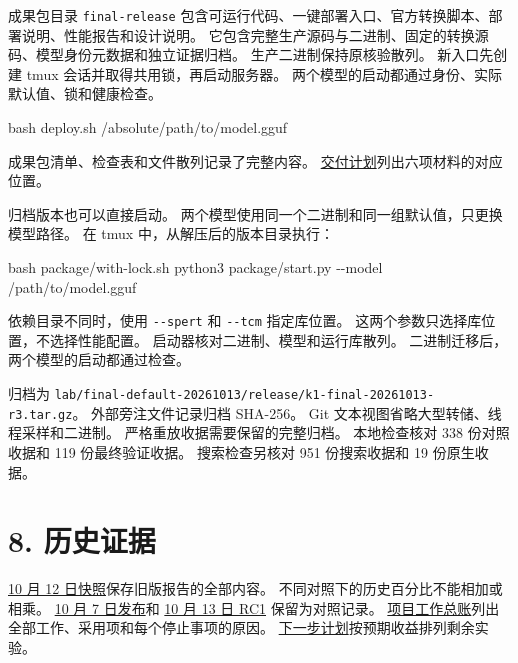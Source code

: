\documentclass[10pt,a4paper,fontset=none]{ctexart}
\newenvironment{Shaded}{}{}
\newcommand{\FunctionTok}[1]{\textcolor[rgb]{0.02,0.16,0.49}{#1}}
\newcommand{\NormalTok}[1]{#1}
\begin{document}
成果包目录 \nolinkurl{final-release}
包含可运行代码、一键部署入口、官方转换脚本、部署说明、性能报告和设计说明。
它包含完整生产源码与二进制、固定的转换源码、模型身份元数据和独立证据归档。
生产二进制保持原核验散列。 新入口先创建 tmux
会话并取得共用锁，再启动服务器。
两个模型的启动都通过身份、实际默认值、锁和健康检查。

\begin{Shaded}
\begin{Highlighting}[]
\FunctionTok{bash}\NormalTok{ deploy.sh /absolute/path/to/model.gguf}
\end{Highlighting}
\end{Shaded}

成果包清单、检查表和文件散列记录了完整内容。
\href{https://github.com/MoyaMryia/riscv-accl/blob/main/spacemit/final-release/SUBMISSION-PLAN.md}{交付计划}列出六项材料的对应位置。

归档版本也可以直接启动。
两个模型使用同一个二进制和同一组默认值，只更换模型路径。 在 tmux
中，从解压后的版本目录执行：

\begin{Shaded}
\begin{Highlighting}[]
\FunctionTok{bash}\NormalTok{ package/with{-}lock.sh python3 package/start.py {-}{-}model /path/to/model.gguf}
\end{Highlighting}
\end{Shaded}

依赖目录不同时，使用 \nolinkurl{--spert} 和 \nolinkurl{--tcm}
指定库位置。 这两个参数只选择库位置，不选择性能配置。
启动器核对二进制、模型和运行库散列。
二进制迁移后，两个模型的启动都通过检查。

归档为
\nolinkurl{lab/final-default-20261013/release/k1-final-20261013-r3.tar.gz}。
外部旁注文件记录归档 SHA-256。 Git
文本视图省略大型转储、线程采样和二进制。
严格重放收据需要保留的完整归档。 本地检查核对 338 份对照收据和 119
份最终验证收据。 搜索检查另核对 951 份搜索收据和 19 份原生收据。

\hypertarget{ux5386ux53f2ux8bc1ux636e}{%
\section{8. 历史证据}\label{ux5386ux53f2ux8bc1ux636e}}

\href{https://github.com/MoyaMryia/riscv-accl/blob/main/spacemit/reports/snapshots/2026-10-12/SUBMISSION-REPORT.pdf}{10
月 12 日快照}保存旧版报告的全部内容。
不同对照下的历史百分比不能相加或相乘。
\href{https://github.com/MoyaMryia/riscv-accl/blob/main/spacemit/reports/2026-10-07-release-verification.md}{10
月 7 日发布}和
\href{https://github.com/MoyaMryia/riscv-accl/blob/main/spacemit/reports/2026-10-13-unified-release-candidate.md}{10
月 13 日 RC1} 保留为对照记录。
\href{https://github.com/MoyaMryia/riscv-accl/blob/main/spacemit/reports/WORK-LEDGER.md}{项目工作总账}列出全部工作、采用项和每个停止事项的原因。
\href{https://github.com/MoyaMryia/riscv-accl/blob/main/spacemit/reports/2026-10-16-next-plan.md}{下一步计划}按预期收益排列剩余实验。
\end{document}
